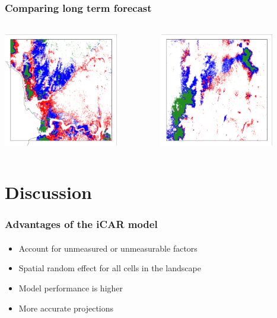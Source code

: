 \documentclass[slidetop,10pt,dvipsnames,leqno,fleqn]{beamer} %
\begin{document}
\begin{frame}
  \frametitle{Comparing long term forecast}
  \framesubtitle{}
  \begin{columns}
    \begin{column}{0.5\textwidth}
      \centering \includegraphics[width=5cm]{./Figures/diff_zoom1.png}
    \end{column}
    \begin{column}{0.5\textwidth}
      \centering \includegraphics[width=5cm]{./Figures/diff_zoom2.png}
    \end{column}
  \end{columns}
\end{frame}

\section{Discussion}

\begin{frame}
  \frametitle{Advantages of the iCAR model}
  \framesubtitle{}
  \begin{block}{}
    \begin{itemize}
    \item Account for unmeasured or unmeasurable factors
    \item Spatial random effect for all cells in the landscape  
    \item Model performance is higher
    \item More accurate projections
    \end{itemize}
  \end{block}
\end{frame}
\end{document}
